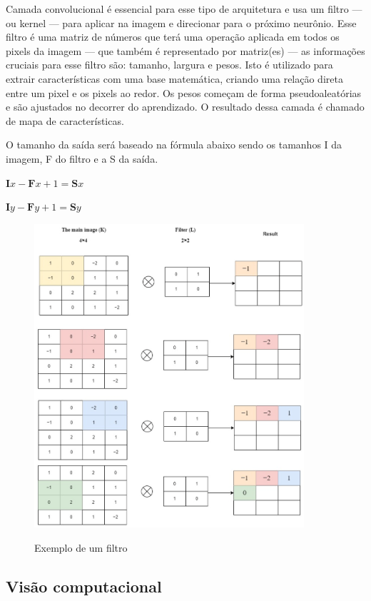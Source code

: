 \documentclass[
	12pt,				%
	openright,			%
	twoside,			%
	a4paper,			%
	english,			%
	french,				%
	spanish,			%
	brazil				%
	]{abntex2}
\begin{document}
Camada convolucional é essencial para esse tipo de arquitetura e usa um filtro — ou kernel — para aplicar na imagem e direcionar para o próximo neurônio. Esse filtro é uma matriz de números que terá uma operação aplicada em todos os pixels da imagem — que também é representado por matriz(es) — as informações cruciais para esse filtro são: tamanho, largura e pesos. Isto é utilizado para extrair características com uma base matemática, criando uma relação direta entre um pixel e os pixels ao redor. Os pesos começam de forma pseudoaleatórias e são ajustados no decorrer do aprendizado. O resultado dessa camada é chamado de mapa de características.

O tamanho da saída será baseado na fórmula abaixo sendo os tamanhos I da imagem, F do filtro e a S da saída.

$ \mathbf{I}x - \mathbf{F}x + 1 = \mathbf{S}x $

$ \mathbf{I}y - \mathbf{F}y + 1 = \mathbf{S}y $

\begin{figure}[H]
	\caption{Exemplo de um filtro}
	\centering %
	\includegraphics[width=10cm]{figures/exemplo_filtro.png} %
	\label{fig:exeplo_filtro}
\end{figure}


\subsection{Visão computacional}
\end{document}
